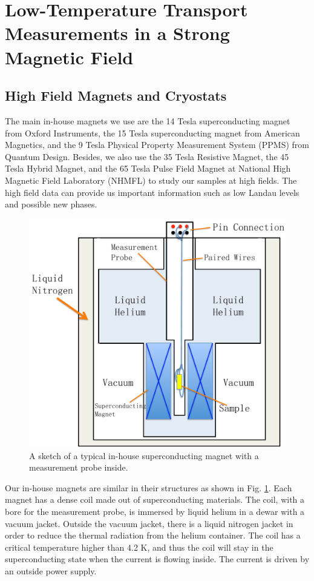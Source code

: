 \section{Low-Temperature Transport Measurements in a Strong Magnetic Field}
\label{sec:expsetup:magnet}

\subsection{High Field Magnets and Cryostats}\label{magnet}

The main in-house magnets we use are the 14 Tesla superconducting magnet from Oxford Instruments, the 15 Tesla superconducting magnet from American Magnetics, and the 9 Tesla Physical Property Measurement System (PPMS) from Quantum Design. Besides, we also use the 35 Tesla Resistive Magnet, the 45 Tesla Hybrid Magnet, and the 65 Tesla Pulse Field Magnet at National High Magnetic Field Laboratory (NHMFL) to study our samples at high fields. The high field data can provide us important information such as low Landau levels and possible new phases.


\begin{figure}[!htbp]
  \begin{center}
\includegraphics[width=0.8\linewidth]{ch-expsetup/figures/Magnet14T.pdf}
\caption{\label{Magnet14T}
A sketch of a typical in-house superconducting magnet with a measurement probe inside.}
  \end{center}
\end{figure}

Our in-house magnets are similar in their structures as shown in Fig. \ref{Magnet14T}. Each magnet has a dense coil made out of superconducting materials. The coil, with a bore for the measurement probe, is immersed by liquid helium in a dewar with a vacuum jacket. Outside the vacuum jacket, there is a liquid nitrogen jacket in order to reduce the thermal radiation from the helium container. The coil has a critical temperature higher than 4.2 K, and thus the coil will stay in the superconducting state when the current is flowing inside. The current is driven by an outside power supply. 

